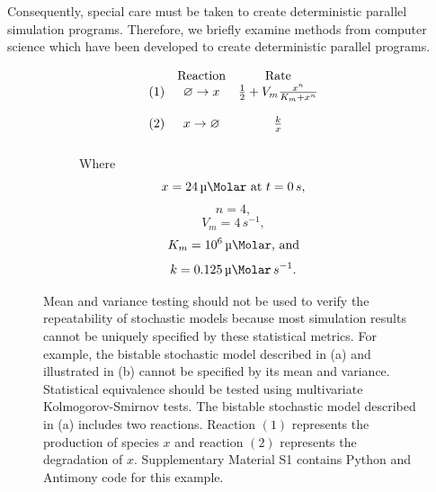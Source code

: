 \documentclass[journal,transmag,twoside]{IEEEtran}
\begin{document}
Consequently, special care must be taken to create deterministic parallel simulation programs. Therefore, we briefly examine methods from computer science which have been developed to create deterministic parallel programs.

\begin{figure}
  \centering
  \begin{subfigure}[b]{0.5\textwidth}
    \centering
    \[
    \begin{array}{c c c}
       & \textrm{Reaction} & \textrm{Rate} \\
      \left( 1 \right) & \varnothing \to x & \frac{1}{2} + V_m \frac{x^n}{K_m + x^n} \\ \\
      \left( 2 \right) & x \to \varnothing & \frac{k}{x} \\ \\
    \end{array}
    \]
    Where
    \[
      x = 24\,\SI{}{\micro\Molar} ~ \textrm{at} ~ t = 0\,s,
    \]
    \[
      n = 4,
    \]
    \[
      V_m = 4\,s^{-1},
    \]
    \[
      K_m = 10^6\,\SI{}{\micro\Molar}\text{, and}
    \]
    \[
      k = 0.125\,\SI{}{\micro\Molar}\,s^{-1}.
    \]
    \vspace{1em}
  \end{subfigure}%
  \begin{subfigure}[b]{0.5\textwidth}
    \centering
    
  \end{subfigure}
  \caption{Mean and variance testing should not be used to verify the repeatability of stochastic models because most simulation results cannot be uniquely specified by these statistical metrics. For example, the bistable stochastic model described in (a) and illustrated in (b) cannot be specified by its mean and variance. Statistical equivalence should be tested using multivariate Kolmogorov-Smirnov tests. The bistable stochastic model described in (a) includes two reactions. Reaction $\left( 1 \right)$ represents the production of species $x$ and reaction $\left( 2 \right)$ represents the degradation of $x$. Supplementary Material S1 contains Python and Antimony \cite{smith2009antimony} code for this example.}
  \label{fig_bistable_plot}
\end{figure}
\end{document}
